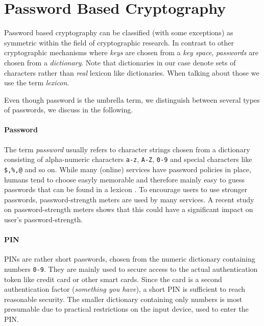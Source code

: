 \section{Password Based Cryptography}
Password based cryptography can be classified (with some exceptions) as symmetric within the field of cryptographic research.
In contrast to other cryptographic mechanisms where \emph{keys} are chosen from a \emph{key space}, \emph{passwords} are chosen from a \emph{dictionary}.
Note that dictionaries in our case denote sets of characters rather than \emph{real} lexicon like dictionaries.
When talking about those we use the term \emph{lexicon}.

Even though password is the umbrella term, we distinguish between several types of passwords, we discuss in the following.

\paragraph{Password}
The term \emph{password} usually refers to character strings chosen from a dictionary consisting of alpha-numeric characters \texttt{a-z}, \texttt{A-Z}, \texttt{0-9} and special characters like \texttt{\$,\%,@} and so on.
While many (online) services have password policies in place, humans tend to choose easyly memorable and therefore mainly easy to guess passwords that can be found in a lexicon \cite{Florencio2007,Gaw2006}.
To encourage users to use stronger passwords, password-strength meters are used by many services.
A recent study \cite{Ur2012} on password-strength meters shows that this could have a significant impact on user's password-strength.

\paragraph{\acl{PIN}}
\acp{PIN} are rather short passwords, chosen from the numeric dictionary containing numbers \texttt{0-9}.
They are mainly used to secure access to the actual authentication token like credit card or other smart cards.
Since the card is a second authentication factor (\emph{something you have}), a short \ac{PIN} is sufficient to reach reasonable security.
The smaller dictionary containing only numbers is most presumable due to practical restrictions on the input device, used to enter the \ac{PIN}.

